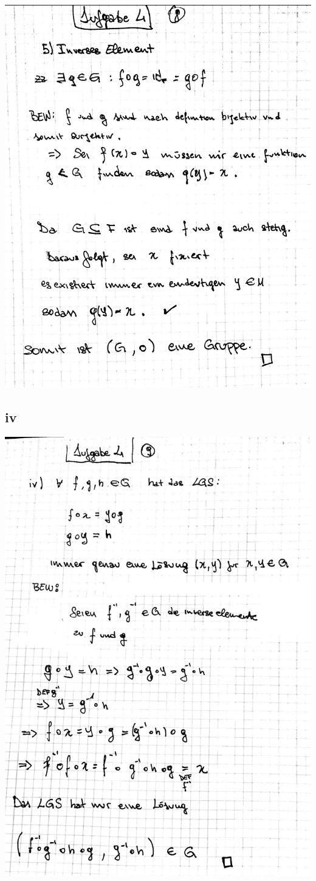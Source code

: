 \documentclass[10pt,a4paper]{article}
\begin{document}
\includegraphics[width=\textwidth]{lat5b_8.jpg}
\subsection{iv}
\includegraphics[width=\textwidth]{lat5b_9.jpg} 
\end{document}
